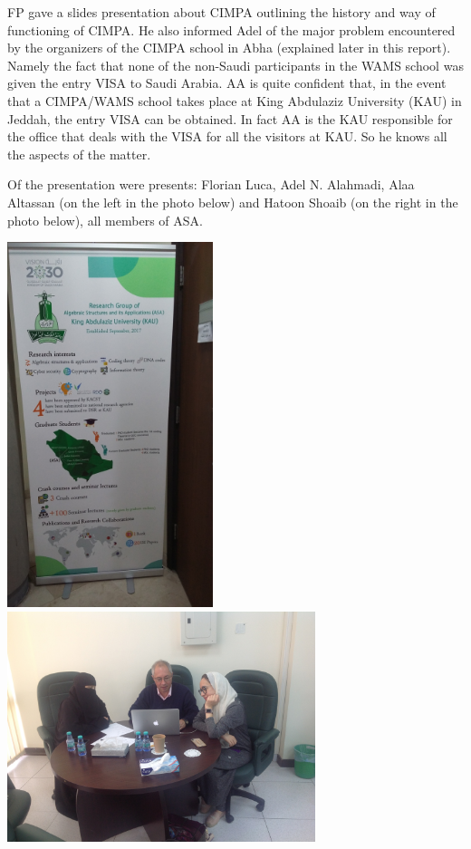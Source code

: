 \documentclass[12pt,a4paper]{scrartcl}
\begin{document}
FP gave a slides presentation about CIMPA outlining the history and way of functioning of CIMPA. He also informed Adel of the major
problem encountered by the organizers of the CIMPA school in Abha (explained later in this report). Namely the fact that none of the non-Saudi participants in the WAMS school was given the entry VISA to Saudi Arabia. AA is quite confident that, in the event that a CIMPA/WAMS school takes place at King Abdulaziz University (KAU) in Jeddah, the entry VISA can be obtained. In fact AA is the KAU responsible for the office that deals with the VISA for all the visitors at KAU. So he knows all the aspects of the matter.

Of the presentation were presents: Florian Luca, Adel N. Alahmadi, Alaa Altassan (on the left in the photo below) and
Hatoon Shoaib (on the right in the photo below), all members of ASA. \bigskip

\centerline{\includegraphics[angle=-90,origin=c,width=6cm]{ASA.jpg}
\includegraphics[origin=c,width=9cm]{ASA1.jpg}\bigskip
}
\end{document}
